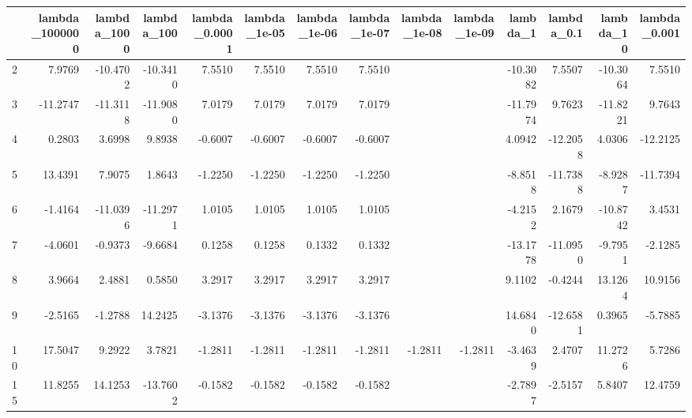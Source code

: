 \begin{tabular}{lrrrrrrrrrrrrr}
\toprule
{} &  lambda\_1000000 &  lambda\_1000 &  lambda\_100 &  lambda\_0.0001 &  lambda\_1e-05 &  lambda\_1e-06 &  lambda\_1e-07 &  lambda\_1e-08 &  lambda\_1e-09 &  lambda\_1 &  lambda\_0.1 &  lambda\_10 &  lambda\_0.001 \\
\midrule
2   &          7.9769 &     -10.4702 &    -10.3410 &         7.5510 &        7.5510 &        7.5510 &        7.5510 &               &               &  -10.3082 &      7.5507 &   -10.3064 &        7.5510 \\
3   &        -11.2747 &     -11.3118 &    -11.9080 &         7.0179 &        7.0179 &        7.0179 &        7.0179 &               &               &  -11.7974 &      9.7623 &   -11.8221 &        9.7643 \\
4   &          0.2803 &       3.6998 &      9.8938 &        -0.6007 &       -0.6007 &       -0.6007 &       -0.6007 &               &               &    4.0942 &    -12.2058 &     4.0306 &      -12.2125 \\
5   &         13.4391 &       7.9075 &      1.8643 &        -1.2250 &       -1.2250 &       -1.2250 &       -1.2250 &               &               &   -8.8518 &    -11.7388 &    -8.9287 &      -11.7394 \\
6   &         -1.4164 &     -11.0396 &    -11.2971 &         1.0105 &        1.0105 &        1.0105 &        1.0105 &               &               &   -4.2152 &      2.1679 &   -10.8742 &        3.4531 \\
7   &         -4.0601 &      -0.9373 &     -9.6684 &         0.1258 &        0.1258 &        0.1332 &        0.1332 &               &               &  -13.1778 &    -11.0950 &    -9.7951 &       -2.1285 \\
8   &          3.9664 &       2.4881 &      0.5850 &         3.2917 &        3.2917 &        3.2917 &        3.2917 &               &               &    9.1102 &     -0.4244 &    13.1264 &       10.9156 \\
9   &         -2.5165 &      -1.2788 &     14.2425 &        -3.1376 &       -3.1376 &       -3.1376 &       -3.1376 &               &               &   14.6840 &    -12.6581 &     0.3965 &       -5.7885 \\
10  &         17.5047 &       9.2922 &      3.7821 &        -1.2811 &       -1.2811 &       -1.2811 &       -1.2811 &       -1.2811 &       -1.2811 &   -3.4639 &      2.4707 &    11.2726 &        5.7286 \\
15  &         11.8255 &      14.1253 &    -13.7602 &        -0.1582 &       -0.1582 &       -0.1582 &       -0.1582 &               &               &   -2.7897 &     -2.5157 &     5.8407 &       12.4759 \\

\end{tabular}
